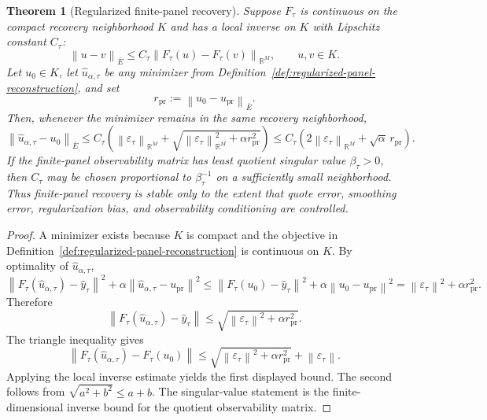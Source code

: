 \documentclass[11pt,a4paper]{amsart}
\theoremstyle{plain}
\newtheorem{theorem}{Theorem}[section]
\theoremstyle{definition}
\theoremstyle{remark}
\newcommand{\R}{\mathbb{R}}
\newcommand{\eps}{\varepsilon}
\newcommand{\norm}[1]{\left\lVert #1\right\rVert}
\begin{document}
\begin{theorem}[Regularized finite-panel recovery]\label{thm:regularized-panel-recovery}
Suppose \(F_\tau\) is continuous on the compact recovery neighborhood \(K\) and has a local
inverse on \(K\) with Lipschitz constant \(C_\tau\):
\[
        \norm{u-v}_{\bar E}
        \le
        C_\tau\norm{F_\tau(u)-F_\tau(v)}_{\R^M},
        \qquad u,v\in K.
\]
Let \(u_0\in K\), let \(\widehat u_{\alpha,\tau}\) be any minimizer from
Definition~\ref{def:regularized-panel-reconstruction}, and set
\[
        r_{\mathrm{pr}}:=\norm{u_0-u_{\mathrm{pr}}}_{\bar E}.
\]
Then, whenever the minimizer remains in the same recovery neighborhood,
\[
        \norm{\widehat u_{\alpha,\tau}-u_0}_{\bar E}
        \le
        C_\tau
        \left(
        \norm{\eps_\tau}_{\R^M}
        +
        \sqrt{\norm{\eps_\tau}_{\R^M}^2+\alpha r_{\mathrm{pr}}^2}
        \right)
        \le
        C_\tau
        \left(
        2\norm{\eps_\tau}_{\R^M}
        +
        \sqrt{\alpha}\,r_{\mathrm{pr}}
        \right).
\]
If the finite-panel observability matrix has least quotient singular value
\(\beta_\tau>0\), then \(C_\tau\) may be chosen proportional to \(\beta_\tau^{-1}\) on a
sufficiently small neighborhood.  Thus finite-panel recovery is stable only to the extent that
quote error, smoothing error, regularization bias, and observability conditioning are controlled.
\end{theorem}

\begin{proof}
A minimizer exists because \(K\) is compact and the objective in
Definition~\ref{def:regularized-panel-reconstruction} is continuous on \(K\).  By optimality of
\(\widehat u_{\alpha,\tau}\),
\[
        \norm{F_\tau(\widehat u_{\alpha,\tau})-\widehat y_\tau}^2
        +
        \alpha\norm{\widehat u_{\alpha,\tau}-u_{\mathrm{pr}}}^2
        \le
        \norm{F_\tau(u_0)-\widehat y_\tau}^2
        +
        \alpha\norm{u_0-u_{\mathrm{pr}}}^2
        =
        \norm{\eps_\tau}^2+\alpha r_{\mathrm{pr}}^2 .
\]
Therefore
\[
        \norm{F_\tau(\widehat u_{\alpha,\tau})-\widehat y_\tau}
        \le
        \sqrt{\norm{\eps_\tau}^2+\alpha r_{\mathrm{pr}}^2}.
\]
The triangle inequality gives
\[
        \norm{F_\tau(\widehat u_{\alpha,\tau})-F_\tau(u_0)}
        \le
        \sqrt{\norm{\eps_\tau}^2+\alpha r_{\mathrm{pr}}^2}
        +
        \norm{\eps_\tau}.
\]
Applying the local inverse estimate yields the first displayed bound.  The second follows from
\(\sqrt{a^2+b^2}\le a+b\).  The singular-value statement is the finite-dimensional inverse bound
for the quotient observability matrix.
\end{proof}
\end{document}
